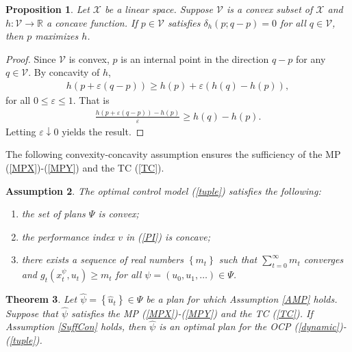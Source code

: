 \documentclass[3p]{elsarticle}
\newcommand{\rz}{\mathbb R}
\newtheorem{thm}{Theorem}
\newtheorem{prop}[thm]{Proposition}
\newtheorem{assu}[thm]{Assumption}
\begin{document}
	
	\begin{prop}\label{SGD}
		Let $\mathcal{X}$ be a linear space.
		Suppose $\mathcal V$ is a convex subset of $\mathcal X$ and $h:\mathcal V\to\rz$ a concave function. If $p\in\mathcal V$ satisfies $\delta_h(p;q-p)=0$ for all $q\in\mathcal V$, then $p$ maximizes $h$.
	\end{prop}
	\begin{proof}
		Since $\mathcal V$ is convex, $p$ is an internal point in the direction $q-p$ for any $q\in\mathcal V$.
		By concavity of $h$,
		\begin{align*}
		h(p+\varepsilon(q-p))\ge h(p)+\varepsilon(h(q)-h(p)),
		\end{align*}
		for all $0\le\varepsilon\le1$. That is
		\begin{align*}
		\frac{h(p+\varepsilon(q-p))-h(p)}{\varepsilon}\ge h(q)-h(p).
		\end{align*}
		Letting $\varepsilon\downarrow0$ yields the result.
	\end{proof}
	
	
	
	
	
	
	
	
	
	
	
	
	
	
	
	
	
	
	The following convexity-concavity assumption ensures the sufficiency of the MP (\ref{MPX})-(\ref{MPY}) and the TC (\ref{TC}). 
	
	\begin{assu}
		The optimal control model (\ref{tuple}) satisfies the following:
		\begin{enumerate}\label{SuffCon}
			\item[(a)]  the set of plans $\Psi$ is convex;	\item[(b)]	the performance index $v$ in (\ref{PI}) is concave;
			\item[(c)]	 there exists a sequence of real  numbers $\left\lbrace m_t\right\rbrace $ such that $\sum_{t=0}^\infty m_t$ converges and 
			$
			g_t(x_t^\psi,u_t)\ge m_t
			$ 
			for all $\psi=(u_0,u_1,\dots)\in\Psi$.
		\end{enumerate}
	\end{assu}
	
	
	
	
	
	
	
	\begin{thm}\label{SufThm}
		Let $\hat{\psi}=\left\lbrace \hat u_t\right\rbrace\in\Psi$ be a plan for which Assumption \ref{AMP} holds. Suppose that $\hat\psi$ satisfies the MP (\ref{MPX})-(\ref{MPY}) and the TC (\ref{TC}). If Assumption \ref{SuffCon} holds, then $\hat\psi$ is an optimal plan for the OCP (\ref{dynamic})-(\ref{tuple}).
	\end{thm}
	
\end{document}
